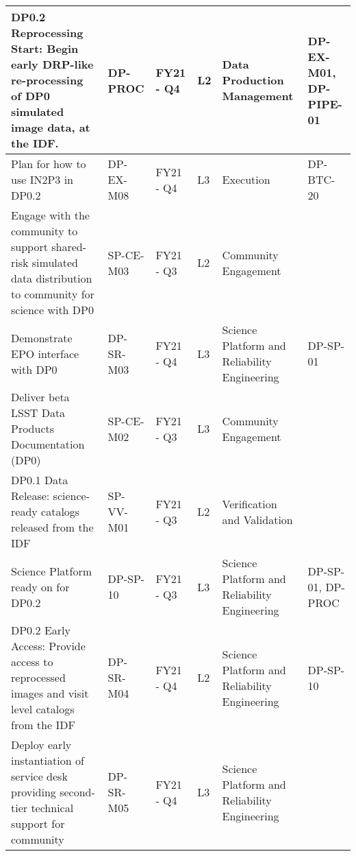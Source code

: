 \begin{longtable} {|p{}|l|l|l|l|p{}|}
{DP0.2 Reprocessing Start: Begin early DRP-like re-processing of DP0 simulated image data, at the IDF.}&{DP-PROC}&{FY21 - Q4}&{L2}&{Data Production Management}&{DP-EX-M01, DP-PIPE-01} \\ \hline
{Plan for how to use IN2P3 in DP0.2}&{DP-EX-M08}&{FY21 - Q4}&{L3}&{Execution}&{DP-BTC-20} \\ \hline
{Engage with the community to support shared-risk simulated data distribution to community for science with DP0}&{SP-CE-M03}&{FY21 - Q3}&{L2}&{Community Engagement}& \\ \hline
{Demonstrate EPO interface with DP0}&{DP-SR-M03}&{FY21 - Q4}&{L3}&{Science Platform and Reliability Engineering}&{DP-SP-01} \\ \hline
{Deliver beta LSST Data Products Documentation (DP0)}&{SP-CE-M02}&{FY21 - Q3}&{L3}&{Community Engagement}& \\ \hline
{DP0.1 Data Release: science-ready catalogs released from the IDF}&{SP-VV-M01}&{FY21 - Q3}&{L2}&{Verification and Validation}& \\ \hline
{Science Platform ready on for DP0.2}&{DP-SP-10}&{FY21 - Q3}&{L3}&{Science Platform and Reliability Engineering}&{DP-SP-01, DP-PROC} \\ \hline
{DP0.2 Early Access: Provide access to reprocessed images and visit level catalogs from the IDF}&{DP-SR-M04}&{FY21 - Q4}&{L2}&{Science Platform and Reliability Engineering}&{DP-SP-10} \\ \hline
{Deploy early instantiation of service desk providing second-tier technical support for community}&{DP-SR-M05}&{FY21 - Q4}&{L3}&{Science Platform and Reliability Engineering}& \\ \hline
\end{longtable} \normalsize
